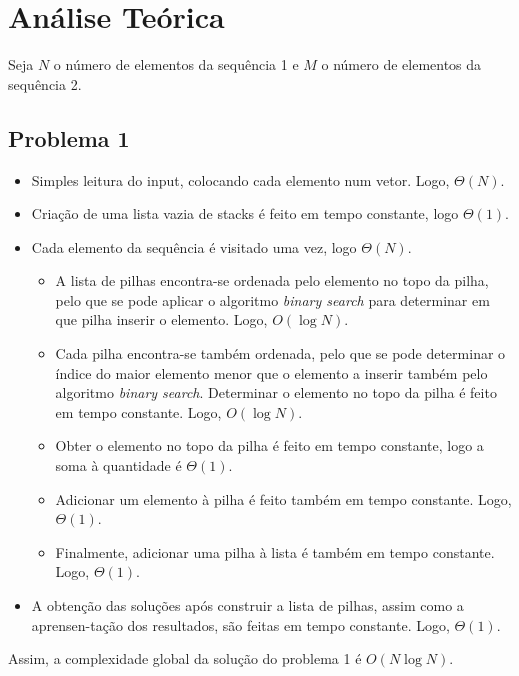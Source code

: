\documentclass[12pt,a4paper]{article}
\begin{document}
  \section{Análise Teórica}

  Seja $N$ o número de elementos da sequência 1 e $M$ o número de elementos da sequência 2.

  \subsection{Problema 1}

  \begin{itemize}
    \setlength{\itemsep}{0pt}
    \item Simples leitura do input, colocando cada elemento num vetor. Logo, $\Theta(N)$.
    \item Criação de uma lista vazia de stacks é feito em tempo constante, logo $\Theta(1)$.
    \item Cada elemento da sequência é visitado uma vez, logo $\Theta(N)$.
    \begin{itemize}
      \setlength{\itemsep}{0pt}
      \item A lista de pilhas encontra-se ordenada pelo elemento no topo da pilha, pelo que se pode aplicar o algoritmo \textit{binary search} para determinar em que pilha inserir o elemento. Logo, $O(\log N)$.
      \item Cada pilha encontra-se também ordenada, pelo que se pode determinar o índice do maior elemento menor que o elemento a inserir também pelo algoritmo \textit{binary search}. Determinar o elemento no topo da pilha é feito em tempo constante. Logo, $O(\log N)$.
      \item Obter o elemento no topo da pilha é feito em tempo constante, logo a soma à quantidade é $\Theta(1)$.
      \item Adicionar um elemento à pilha é feito também em tempo constante. Logo, $\Theta(1)$.
      \item Finalmente, adicionar uma pilha à lista é também em tempo constante. Logo, $\Theta(1)$.
    \end{itemize}
    \item A obtenção das soluções após construir a lista de pilhas, assim como a aprensen-tação dos resultados, são feitas em tempo constante. Logo, $\Theta(1)$.
  \end{itemize}

  Assim, a complexidade global da solução do problema 1 é $O(N \log N)$.
\end{document}

